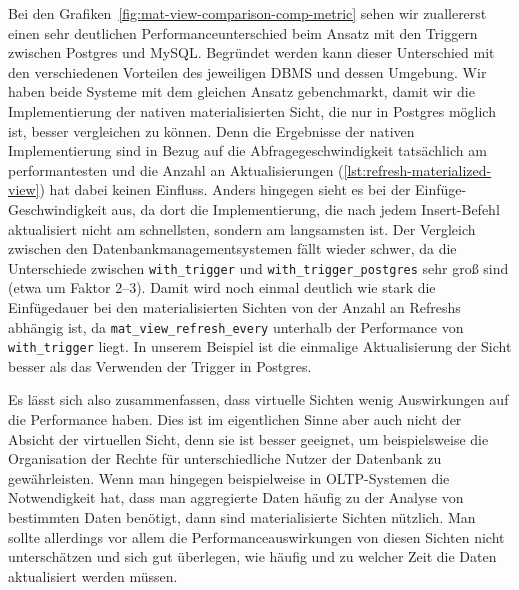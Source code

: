 Bei den Grafiken~\ref{fig:mat-view-comparison-comp-metric} sehen wir zuallererst einen sehr deutlichen Performanceunterschied beim Ansatz mit den Triggern zwischen Postgres und MySQL\@.
Begründet werden kann dieser Unterschied mit den verschiedenen Vorteilen des jeweiligen DBMS und dessen Umgebung.
Wir haben beide Systeme mit dem gleichen Ansatz gebenchmarkt, damit wir die Implementierung der nativen materialisierten Sicht, die nur in Postgres möglich ist, besser vergleichen zu können.
Denn die Ergebnisse der nativen Implementierung sind in Bezug auf die Abfragegeschwindigkeit tatsächlich am performantesten und die Anzahl an Aktualisierungen (\ref{lst:refresh-materialized-view}) hat dabei keinen Einfluss.
Anders hingegen sieht es bei der Einfüge-Geschwindigkeit aus, da dort die Implementierung, die nach jedem Insert-Befehl aktualisiert nicht am schnellsten, sondern am langsamsten ist.
Der Vergleich zwischen den Datenbankmanagementsystemen fällt wieder schwer, da die Unterschiede zwischen \texttt{with\_trigger} und \texttt{with\_trigger\_postgres} sehr groß sind (etwa um Faktor 2--3).
Damit wird noch einmal deutlich wie stark die Einfügedauer bei den materialisierten Sichten von der Anzahl an Refreshs abhängig ist, da \texttt{mat\_view\_refresh\_every} unterhalb der Performance von \texttt{with\_trigger} liegt.
In unserem Beispiel ist die einmalige Aktualisierung der Sicht besser als das Verwenden der Trigger in Postgres.

Es lässt sich also zusammenfassen, dass virtuelle Sichten wenig Auswirkungen auf die Performance haben.
Dies ist im eigentlichen Sinne aber auch nicht der Absicht der virtuellen Sicht, denn sie ist besser geeignet, um beispielsweise die Organisation der Rechte für unterschiedliche Nutzer der Datenbank zu gewährleisten.
Wenn man hingegen beispielweise in OLTP-Systemen die Notwendigkeit hat, dass man aggregierte Daten häufig zu der Analyse von bestimmten Daten benötigt, dann sind materialisierte Sichten nützlich.
Man sollte allerdings vor allem die Performanceauswirkungen von diesen Sichten nicht unterschätzen und sich gut überlegen, wie häufig und zu welcher Zeit die Daten aktualisiert werden müssen.